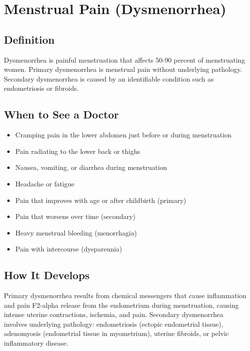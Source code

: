 \chapter{Menstrual Pain (Dysmenorrhea)}

\section*{Definition}
Dysmenorrhea is painful menstruation that affects 50-90 percent of menstruating women. Primary dysmenorrhea is menstrual pain without underlying pathology. Secondary dysmenorrhea is caused by an identifiable condition such as endometriosis or fibroids.

\section*{When to See a Doctor}
\begin{itemize}
\item Cramping pain in the lower abdomen just before or during menstruation
\item Pain radiating to the lower back or thighs
\item Nausea, vomiting, or diarrhea during menstruation
\item Headache or fatigue
\item Pain that improves with age or after childbirth (primary)
\item Pain that worsens over time (secondary)
\item Heavy menstrual bleeding (menorrhagia)
\item Pain with intercourse (dyspareunia)
\end{itemize}

\section*{How It Develops}
Primary dysmenorrhea results from chemical messengers that cause inflammation and pain F2-alpha release from the endometrium during menstruation, causing intense uterine contractions, ischemia, and pain. Secondary dysmenorrhea involves underlying pathology: endometriosis (ectopic endometrial tissue), adenomyosis (endometrial tissue in myometrium), uterine fibroids, or pelvic inflammatory disease.

